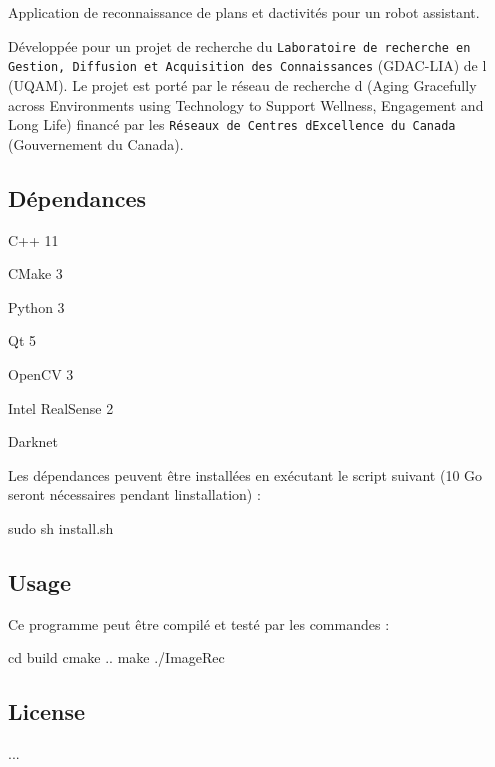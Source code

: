 Application de reconnaissance de plans et d\textquotesingle{}activités pour un robot assistant.

Développée pour un projet de recherche du {\tt Laboratoire de recherche en Gestion, Diffusion et Acquisition des Connaissances} (G\+D\+A\+C-\/\+L\+IA) de l (U\+Q\+AM). Le projet est porté par le réseau de recherche d (Aging Gracefully across Environments using Technology to Support Wellness, Engagement and Long Life) financé par les {\tt Réseaux de Centres d\textquotesingle{}Excellence du Canada} (Gouvernement du Canada).

\subsection*{Dépendances}


\begin{DoxyItemize}
\item C++ 11
\item C\+Make 3
\item Python 3
\item Qt 5
\item Open\+CV 3
\item Intel Real\+Sense 2
\item Darknet
\end{DoxyItemize}

Les dépendances peuvent être installées en exécutant le script suivant (10 Go seront nécessaires pendant l\textquotesingle{}installation) \+:


\begin{DoxyCode}
sudo sh install.sh
\end{DoxyCode}


\subsection*{Usage}

Ce programme peut être compilé et testé par les commandes \+:


\begin{DoxyCode}
cd build
cmake ..
make
 ./ImageRec
\end{DoxyCode}


\subsection*{License}

...

